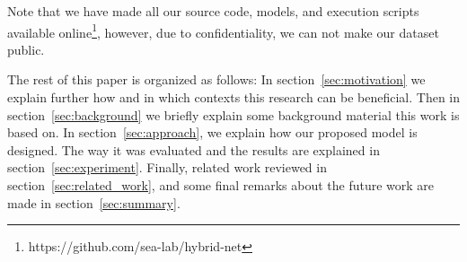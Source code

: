 Note that we have made all our source code, models, and execution scripts available online\footnote{https://github.com/sea-lab/hybrid-net}, however, due to confidentiality, we can not make our dataset public. 

The rest of this paper is organized as follows: In section~\ref{sec:motivation} we explain further how and in which contexts this research can be beneficial. Then in section~\ref{sec:background} we briefly explain some background material this work is based on. In section~\ref{sec:approach}, we explain how our proposed model is designed. The way it was evaluated and the results are explained in section~\ref{sec:experiment}. Finally, related work reviewed in section~\ref{sec:related_work}, and some final remarks about the future work are made in section~\ref{sec:summary}.
